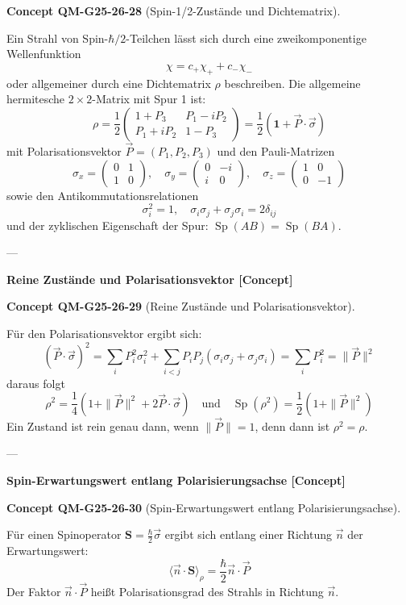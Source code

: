 \documentclass[10pt, letterpaper]{article}
\newcommand{\CustomHeading}[3]{%
  \par\medskip\noindent%
  \textbf{#1 #2} \textnormal{(#3)}.\enskip%
}
\newenvironment{CONC}[2]{\begin{unitbox}\CustomHeading{Concept}{#1}{#2}}{\end{unitbox}}
\begin{document}
\begin{CONC}{QM-G25-26-28}{Spin-1/2-Zustände und Dichtematrix}
Ein Strahl von Spin-$\hbar/2$-Teilchen lässt sich durch eine zweikomponentige Wellenfunktion
\[
\chi = c_+ \chi_+ + c_- \chi_-
\]
oder allgemeiner durch eine Dichtematrix $\rho$ beschreiben. Die allgemeine hermitesche $2\times2$-Matrix mit Spur 1 ist:
\[
\rho = \frac{1}{2} \left( \begin{array}{cc}
1 + P_3 & P_1 - i P_2 \\
P_1 + i P_2 & 1 - P_3
\end{array} \right) = \frac{1}{2}(\mathbf{1} + \vec{P} \cdot \vec{\sigma})
\]
mit Polarisationsvektor $\vec{P} = (P_1, P_2, P_3)$ und den Pauli-Matrizen
\[
\sigma_x = \begin{pmatrix} 0 & 1 \\ 1 & 0 \end{pmatrix}, \quad
\sigma_y = \begin{pmatrix} 0 & -i \\ i & 0 \end{pmatrix}, \quad
\sigma_z = \begin{pmatrix} 1 & 0 \\ 0 & -1 \end{pmatrix}
\]
sowie den Antikommutationsrelationen
\[
\sigma_i^2 = 1, \quad \sigma_i \sigma_j + \sigma_j \sigma_i = 2 \delta_{ij}
\]
und der zyklischen Eigenschaft der Spur: $\operatorname{Sp}(AB) = \operatorname{Sp}(BA)$.
\end{CONC}

---

\textbf{Reine Zustände und Polarisationsvektor [Concept]}

\begin{CONC}{QM-G25-26-29}{Reine Zustände und Polarisationsvektor}
Für den Polarisationsvektor ergibt sich:
\[
(\vec{P} \cdot \vec{\sigma})^2 = \sum_i P_i^2 \sigma_i^2 + \sum_{i<j} P_i P_j (\sigma_i \sigma_j + \sigma_j \sigma_i) = \sum_i P_i^2 = \|\vec{P}\|^2
\]
daraus folgt
\[
\rho^2 = \frac{1}{4} \left(1 + \|\vec{P}\|^2 + 2 \vec{P} \cdot \vec{\sigma} \right)
\quad \text{und} \quad
\operatorname{Sp}(\rho^2) = \frac{1}{2}(1 + \|\vec{P}\|^2)
\]
Ein Zustand ist rein genau dann, wenn $\|\vec{P}\| = 1$, denn dann ist $\rho^2 = \rho$.
\end{CONC}

---

\textbf{Spin-Erwartungswert entlang Polarisierungsachse [Concept]}

\begin{CONC}{QM-G25-26-30}{Spin-Erwartungswert entlang Polarisierungsachse}
Für einen Spinoperator $\mathbf{S} = \frac{\hbar}{2} \vec{\sigma}$ ergibt sich entlang einer Richtung $\vec{n}$ der Erwartungswert:
\[
\langle \vec{n} \cdot \mathbf{S} \rangle_\rho = \frac{\hbar}{2} \vec{n} \cdot \vec{P}
\]
Der Faktor $\vec{n} \cdot \vec{P}$ heißt Polarisationsgrad des Strahls in Richtung $\vec{n}$.
\end{CONC}
\end{document}
